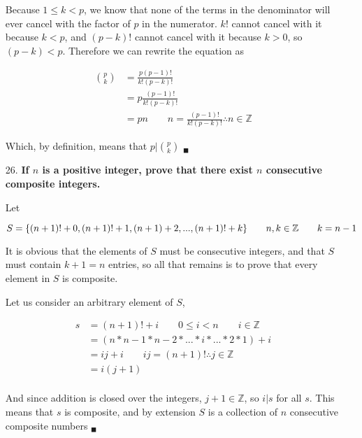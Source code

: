 \documentclass{article}
\begin{document}
\begin{enumerate}
					Because $1 \leq k < p$, we know that none of the terms in the denominator will 
					ever cancel with the factor of $p$ in the numerator. $k!$ cannot cancel with it 
					because $k < p$, and $(p-k)!$ cannot cancel with it because $k > 0$, 
					so $(p - k) < p$. Therefore we can rewrite the equation as

					\begin{align*}
						\binom{p}{k} &= \frac{p(p-1)!}{k!(p-k)!} \\
							&= p\frac{(p-1)!}{k!(p-k)!} \\
							&= pn \qquad n = \tfrac{(p-1)!}{k!(p-k)!} \therefore n \in \mathbb{Z}
					\end{align*}	

					Which, by definition, means that $p | \binom{p}{k}$ $_{\blacksquare}$

		\item[26.]	\textbf{If $n$ is a positive integer, prove that there exist $n$ consecutive 
					composite integers.}

					Let 

					\begin{equation*}
						S = \lbrace{}(n+1)! + 0, (n+1)! + 1, (n+1) + 2, ..., (n+1)! + k\rbrace{} \\
							\qquad n, k \in \mathbb{Z} \qquad k = n - 1
					\end{equation*}

					It is obvious that the elements of $S$ must be consecutive integers, and that
					$S$ must contain $k + 1 = n$ entries, so all that remains is to prove that every
					element in $S$ is composite.

					Let us consider an arbitrary element of $S$, 

					\begin{align*}
						s &= (n+1)! + i \qquad 0 \leq i < n \qquad i \in \mathbb{Z} \\
						  &= (n * n-1 * n-2 * ... * i * ... * 2 * 1) + i \\
						  &= ij + i \qquad ij = (n+1)! \therefore j \in \mathbb{Z} \\
						  &= i(j + 1) \\
					\end{align*}

					And since addition is closed over the integers, $j + 1 \in \mathbb{Z}$, so 
					$i | s$ for all $s$. This means that $s$ is composite, and by extension $S$ is a
					collection of $n$ consecutive composite numbers $_{\blacksquare}$


\end{enumerate}
\end{document}
